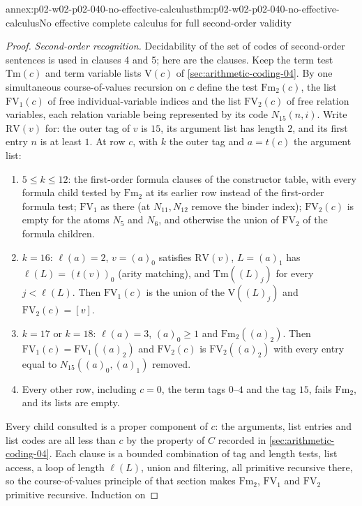 \begin{annexitem}{annex:p02-w02-p02-040-no-effective-calculus}{thm:p02-w02-p02-040-no-effective-calculus}{No effective complete calculus for full second-order validity}
\begin{proof}
\emph{Second-order recognition.}  Decidability of the set of codes of
second-order sentences is used in clauses 4 and 5; here are the clauses.
Keep the term test \(\mathrm{Tm}(c)\) and term variable lists \(\mathrm{V}(c)\)
of \cref{sec:arithmetic-coding-04}.  By one simultaneous course-of-values
recursion on \(c\) define the test \(\mathrm{Fm}_2(c)\), the list
\(\mathrm{FV}_1(c)\) of free individual-variable indices and the list
\(\mathrm{FV}_2(c)\) of free relation variables, each relation variable being
represented by its code \(N_{15}(n,i)\).  Write \(\mathrm{RV}(v)\) for: the
outer tag of \(v\) is \(15\), its argument list has length \(2\), and its first
entry \(n\) is at least \(1\).  At row \(c\), with \(k\) the outer tag and
\(a=t(c)\) the argument list:
\begin{enumerate}
 \item \(5\le k\le12\): the first-order formula clauses of the constructor table, with
   every formula child tested by \(\mathrm{Fm}_2\) at its earlier row instead
   of the first-order formula test; \(\mathrm{FV}_1\) as there (at
   \(N_{11},N_{12}\) remove the binder index); \(\mathrm{FV}_2(c)\) is empty
   for the atoms \(N_5\) and \(N_6\), and otherwise the union of
   \(\mathrm{FV}_2\) of the formula children.
 \item \(k=16\): \(\ell(a)=2\), \(v=(a)_0\) satisfies \(\mathrm{RV}(v)\), \(L=(a)_1\)
   has \(\ell(L)=(t(v))_0\) (arity matching), and \(\mathrm{Tm}((L)_j)\) for
   every \(j<\ell(L)\).  Then \(\mathrm{FV}_1(c)\) is the union of the
   \(\mathrm V((L)_j)\) and \(\mathrm{FV}_2(c)=[v]\).
 \item \(k=17\) or \(k=18\): \(\ell(a)=3\), \((a)_0\ge1\) and
   \(\mathrm{Fm}_2((a)_2)\).  Then \(\mathrm{FV}_1(c)=\mathrm{FV}_1((a)_2)\) and
   \(\mathrm{FV}_2(c)\) is \(\mathrm{FV}_2((a)_2)\) with every entry equal to
   \(N_{15}((a)_0,(a)_1)\) removed.
 \item Every other row, including \(c=0\), the term tags \(0\)--\(4\) and the tag \(15\), fails
   \(\mathrm{Fm}_2\), and its lists are empty.
\end{enumerate}
Every child consulted is a proper component of \(c\): the arguments, list
entries and list codes are all less than \(c\) by the property of \(C\)
recorded in \cref{sec:arithmetic-coding-04}.  Each clause is a bounded
combination of tag and length tests, list access, a loop of length
\(\ell(L)\), union and filtering, all primitive recursive there, so the
course-of-values principle of that section makes \(\mathrm{Fm}_2\),
\(\mathrm{FV}_1\) and \(\mathrm{FV}_2\) primitive recursive.  Induction on

\end{proof}
\end{annexitem}
